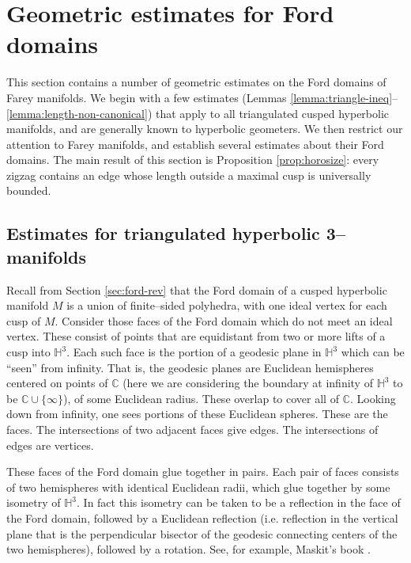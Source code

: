 \documentclass[11pt]{amsart}
\newcommand{\HH}{{\mathbb{H}}}
\newcommand{\CC}{{\mathbb{C}}}
\theoremstyle{plain}
\theoremstyle{definition}
\begin{document}
\section{Geometric estimates for Ford domains}\label{sec:horosphere}

This section contains a number of geometric estimates on the Ford
domains of Farey manifolds.  We begin with a few estimates (Lemmas
\ref{lemma:triangle-ineq}--\ref{lemma:length-non-canonical}) that
apply to all triangulated cusped hyperbolic manifolds, and are
generally known to hyperbolic geometers.  We then restrict our
attention to Farey manifolds, and establish several estimates about
their Ford domains.  The main result of this section is Proposition
\ref{prop:horosize}: every zigzag contains an edge whose length
outside a maximal cusp is universally bounded.

\subsection{Estimates for triangulated hyperbolic 3--manifolds}

Recall from Section \ref{sec:ford-rev} that the Ford domain of a
cusped hyperbolic manifold $M$ is a union of finite--sided polyhedra, with one
ideal vertex for each cusp of $M$.  Consider those faces of the Ford
domain which do not meet an ideal vertex.  These consist of points
that are equidistant from two or more lifts of a cusp into $\HH^3$.
Each such face is the portion of a geodesic plane in $\HH^3$ which can
be ``seen'' from infinity.  That is, the geodesic planes are Euclidean
hemispheres centered on points of $\CC$ (here we are considering the
boundary at infinity of $\HH^3$ to be $\CC \cup \{\infty\}$), of some
Euclidean radius.  These overlap to cover all of $\CC$.  Looking down
from infinity, one sees portions of these Euclidean spheres.  These
are the faces.  The intersections of two adjacent faces give edges.  The
intersections of edges are vertices.

These faces of the Ford domain glue together in pairs.  Each pair of
faces consists of two hemispheres with identical Euclidean radii,
which glue together by some isometry of $\HH^3$.  In fact this
isometry can be taken to be a reflection in the face of the Ford
domain, followed by a Euclidean reflection (i.e. reflection in the
vertical plane that is the perpendicular bisector of the geodesic
connecting centers of the two hemispheres), followed by a rotation.
See, for example, Maskit's book \cite[Chapter IV, Section G]{maskit}.
\end{document}
